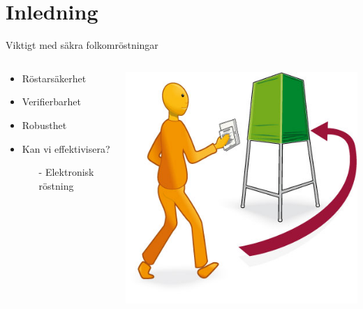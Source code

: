 \section{Inledning}

\frame{\titlepage}

\begin{frame}{Viktigt med säkra folkomröstningar}


\begin{columns}
    \begin{column}{0.5\textwidth}
        \begin{itemize}
			\item Röstarsäkerhet
			\item Verifierbarhet
			\item Robusthet
			\item[]
			\item Kan vi effektivisera?
			\begin{itemize}
				\item[-] Elektronisk röstning
			\end{itemize}
		\end{itemize}
    \end{column}
	\begin{column}{0.5\textwidth}
    	\includegraphics[width=1\textwidth]{images/rosta.jpg}
	\end{column}
\end{columns}

\end{frame}